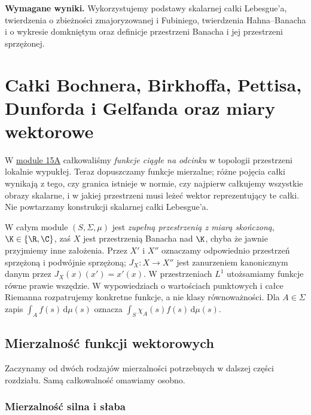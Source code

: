 \setcounter{section}{15}
\noindent\textbf{Wymagane wyniki.} Wykorzystujemy podstawy skalarnej całki Lebesgue'a, twierdzenia o zbieżności zmajoryzowanej i Fubiniego, twierdzenia Hahna--Banacha i o wykresie domkniętym oraz definicje przestrzeni Banacha i jej przestrzeni sprzężonej.\medskip
\begingroup
\renewcommand{\thesection}{15B}
\renewcommand{\theHsection}{15B}
\section{Całki Bochnera, Birkhoffa, Pettisa, Dunforda i Gelfanda oraz miary wektorowe}
\label{sec:integral-vector15b}

\providecommand{\atlasref}[2]{#2}


W \hyperref[sec:integral-lcs15a]{module 15A} całkowaliśmy \emph{funkcje ciągłe na odcinku} w topologii
przestrzeni lokalnie wypukłej. Teraz dopuszczamy funkcje mierzalne;
różne pojęcia całki wynikają z tego, czy granica istnieje w normie,
czy najpierw całkujemy wszystkie obrazy skalarne, i w jakiej przestrzeni
musi leżeć wektor reprezentujący te całki. Nie powtarzamy konstrukcji
skalarnej całki Lebesgue'a.

W całym module $(S,\Sigma,\mu)$ jest \emph{zupełną przestrzenią z miarą
skończoną}, $\K\in\{\R,\C\}$, zaś $X$ jest przestrzenią Banacha nad
$\K$, chyba że jawnie przyjmiemy inne założenia. Przez $X'$ i $X''$
oznaczamy odpowiednio przestrzeń sprzężoną i podwójnie sprzężoną; $J_X:X\to X''$
jest zanurzeniem kanonicznym danym przez $J_X(x)(x')=x'(x)$.
W przestrzeniach $L^1$ utożsamiamy funkcje równe prawie wszędzie.
W wypowiedziach o wartościach punktowych i całce Riemanna
rozpatrujemy konkretne funkcje, a nie klasy równoważności. Dla $A\in\Sigma$ zapis
$\int_A f(s)\,\mathrm d\mu(s)$ oznacza $\int_S\chi_A(s)f(s)\,\mathrm d\mu(s)$.

\subsection{Mierzalność funkcji wektorowych}

Zaczynamy od dwóch rodzajów mierzalności potrzebnych w dalszej
części rozdziału. Samą całkowalność omawiamy osobno.

\subsubsection{Mierzalność silna i słaba}

